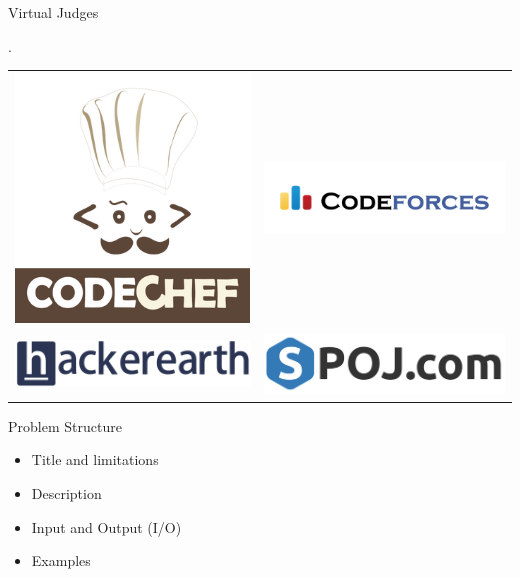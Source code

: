 \documentclass{beamer}
\begin{document}
\begin{frame}{Virtual Judges}

   \vspace{2mm}
   \begin{centering}
   \bgroup
   \def\arraystretch{5}
   \setlength\tabcolsep{35pt}.
   \begin{tabular}{ c c }
   \href{www.codechef.com}{\includegraphics[width=0.23\linewidth]{../img/codechef}} &
   \href{www.codeforces.com}{\includegraphics[width=0.23\linewidth]{../img/codeforces}} \\
   \href{www.hackerearth.com}{\includegraphics[width=0.23\linewidth]{../img/hackerearth}} &
   \href{www.spoj.com}{\includegraphics[width=0.23\linewidth]{../img/spoj}}
   \end{tabular}
   \egroup
   \end{centering}

\end{frame}

\begin{frame}{Problem Structure}
  \begin{itemize}
    \item Title and limitations
    \item Description
    \item Input and Output (I/O)
    \item Examples
  \end{itemize}
\end{frame}
\end{document}
